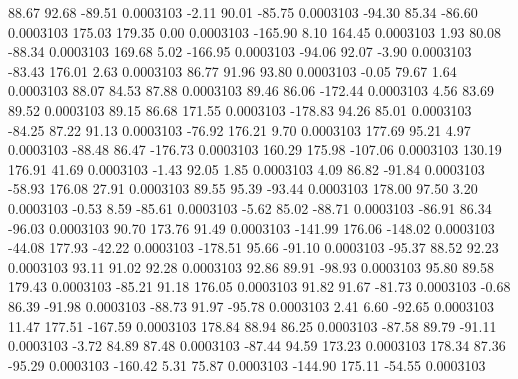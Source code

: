        88.67       92.68      -89.51     0.0003103
       -2.11       90.01      -85.75     0.0003103
      -94.30       85.34      -86.60     0.0003103
      175.03      179.35        0.00     0.0003103
     -165.90        8.10      164.45     0.0003103
        1.93       80.08      -88.34     0.0003103
      169.68        5.02     -166.95     0.0003103
      -94.06       92.07       -3.90     0.0003103
      -83.43      176.01        2.63     0.0003103
       86.77       91.96       93.80     0.0003103
       -0.05       79.67        1.64     0.0003103
       88.07       84.53       87.88     0.0003103
       89.46       86.06     -172.44     0.0003103
        4.56       83.69       89.52     0.0003103
       89.15       86.68      171.55     0.0003103
     -178.83       94.26       85.01     0.0003103
      -84.25       87.22       91.13     0.0003103
      -76.92      176.21        9.70     0.0003103
      177.69       95.21        4.97     0.0003103
      -88.48       86.47     -176.73     0.0003103
      160.29      175.98     -107.06     0.0003103
      130.19      176.91       41.69     0.0003103
       -1.43       92.05        1.85     0.0003103
        4.09       86.82      -91.84     0.0003103
      -58.93      176.08       27.91     0.0003103
       89.55       95.39      -93.44     0.0003103
      178.00       97.50        3.20     0.0003103
       -0.53        8.59      -85.61     0.0003103
       -5.62       85.02      -88.71     0.0003103
      -86.91       86.34      -96.03     0.0003103
       90.70      173.76       91.49     0.0003103
     -141.99      176.06     -148.02     0.0003103
      -44.08      177.93      -42.22     0.0003103
     -178.51       95.66      -91.10     0.0003103
      -95.37       88.52       92.23     0.0003103
       93.11       91.02       92.28     0.0003103
       92.86       89.91      -98.93     0.0003103
       95.80       89.58      179.43     0.0003103
      -85.21       91.18      176.05     0.0003103
       91.82       91.67      -81.73     0.0003103
       -0.68       86.39      -91.98     0.0003103
      -88.73       91.97      -95.78     0.0003103
        2.41        6.60      -92.65     0.0003103
       11.47      177.51     -167.59     0.0003103
      178.84       88.94       86.25     0.0003103
      -87.58       89.79      -91.11     0.0003103
       -3.72       84.89       87.48     0.0003103
      -87.44       94.59      173.23     0.0003103
      178.34       87.36      -95.29     0.0003103
     -160.42        5.31       75.87     0.0003103
     -144.90      175.11      -54.55     0.0003103
